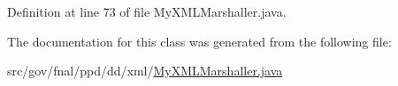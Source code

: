 Definition at line 73 of file My\-X\-M\-L\-Marshaller.\-java.



The documentation for this class was generated from the following file\-:\begin{DoxyCompactItemize}
\item 
src/gov/fnal/ppd/dd/xml/\hyperlink{MyXMLMarshaller_8java}{My\-X\-M\-L\-Marshaller.\-java}\end{DoxyCompactItemize}
